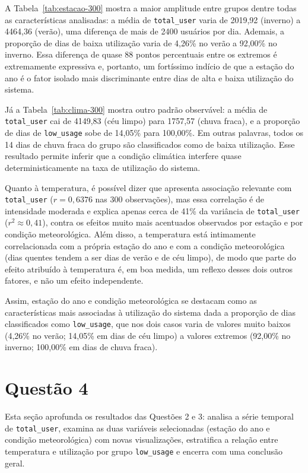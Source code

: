 \documentclass[10pt, a4paper]{article}
\begin{document}
A Tabela~\ref{tab:estacao-300} mostra a maior amplitude entre grupos dentre todas as características analisadas: a média de \texttt{total\_user} varia de 2019,92 (inverno) a 4464,36 (verão), uma diferença de mais de 2400 usuários por dia. Ademais, a proporção de dias de baixa utilização varia de 4,26\% no verão a 92,00\% no inverno. Essa diferença de quase 88 pontos percentuais entre os extremos é extremamente expressiva e, portanto, um fortíssimo indício de que a estação do ano é o fator isolado mais discriminante entre dias de alta e baixa utilização do sistema.

Já a Tabela~\ref{tab:clima-300} mostra outro padrão observável: a média de \texttt{total\_user} cai de 4149,83 (céu limpo) para 1757,57 (chuva fraca), e a proporção de dias de \texttt{low\_usage} sobe de 14,05\% para 100,00\%. Em outras palavras, todos os 14 dias de chuva fraca do grupo são classificados como de baixa utilização. Esse resultado permite inferir que a condição climática interfere quase deterministicamente na taxa de utilização do sistema.

Quanto à temperatura, é possível dizer que apresenta associação relevante com \texttt{total\_user} ($r = 0{,}6376$ nas 300 observações), mas essa correlação é de intensidade moderada e explica apenas cerca de 41\% da variância de \texttt{total\_user} ($r^2 \approx 0{,}41$), contra os efeitos muito mais acentuados observados por estação e por condição meteorológica. Além disso, a temperatura está intimamente correlacionada com a própria estação do ano e com a condição meteorológica (dias quentes tendem a ser dias de verão e de céu limpo), de modo que parte do efeito atribuído à temperatura é, em boa medida, um reflexo desses dois outros fatores, e não um efeito independente.

Assim, estação do ano e condição meteorológica se destacam como as características mais associadas à utilização do sistema dada a proporção de dias classificados como \texttt{low\_usage}, que nos dois casos varia de valores muito baixos (4,26\% no verão; 14,05\% em dias de céu limpo) a valores extremos (92,00\% no inverno; 100,00\% em dias de chuva fraca).

\clearpage
\section{Questão 4}

Esta seção aprofunda os resultados das Questões 2 e 3: analisa a série temporal de \texttt{total\_user}, examina as duas variáveis selecionadas (estação do ano e condição meteorológica) com novas visualizações, estratifica a relação entre temperatura e utilização por grupo \texttt{low\_usage} e encerra com uma conclusão geral.
\end{document}

